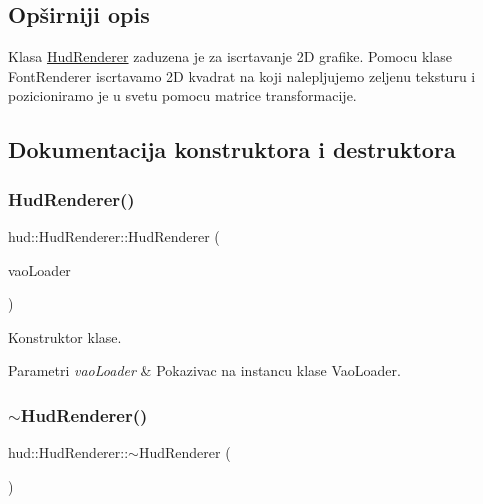 \subsection{Opširniji opis}
Klasa \hyperlink{classhud_1_1HudRenderer}{Hud\+Renderer} zaduzena je za iscrtavanje 2D grafike. Pomocu klase Font\+Renderer iscrtavamo 2D kvadrat na koji nalepljujemo zeljenu teksturu i pozicioniramo je u svetu pomocu matrice transformacije. 

\subsection{Dokumentacija konstruktora i destruktora}
\mbox{\label{classhud_1_1HudRenderer_ae84f8293c08515d5a7b3e23632b8b6b0}} 
\subsubsection{\texorpdfstring{Hud\+Renderer()}{HudRenderer()}}
{\footnotesize\ttfamily hud\+::\+Hud\+Renderer\+::\+Hud\+Renderer (\begin{DoxyParamCaption}\item[{\hyperlink{classcore_1_1VaoLoader}{Vao\+Loader} $\ast$}]{vao\+Loader }\end{DoxyParamCaption})}



Konstruktor klase. 


\begin{DoxyParams}{Parametri}
{\em vao\+Loader} & Pokazivac na instancu klase Vao\+Loader. \\
\hline
\end{DoxyParams}
\mbox{\label{classhud_1_1HudRenderer_abe526b3d520a64670efa3d3aaa986d52}} 
\subsubsection{\texorpdfstring{$\sim$\+Hud\+Renderer()}{~HudRenderer()}}
{\footnotesize\ttfamily hud\+::\+Hud\+Renderer\+::$\sim$\+Hud\+Renderer (\begin{DoxyParamCaption}{ }\end{DoxyParamCaption})}



